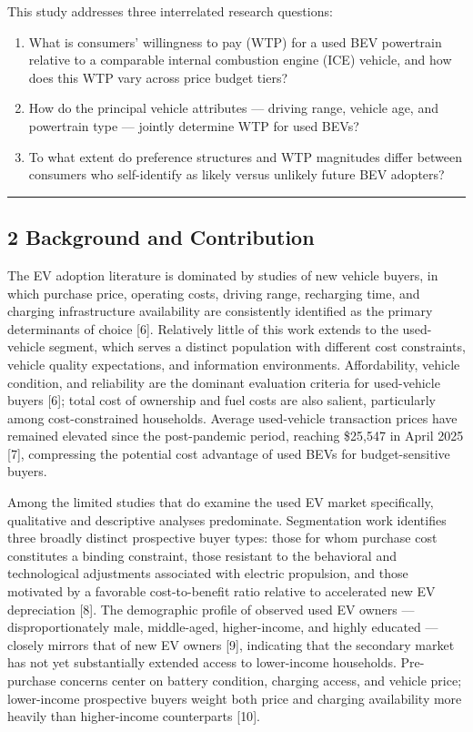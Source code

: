 \documentclass[
  letterpaper,
  DIV=11,
  numbers=noendperiod]{scrartcl}
\providecommand{\tightlist}{%
  \setlength{\itemsep}{0pt}\setlength{\parskip}{0pt}}\usepackage{longtable,booktabs,array}
\begin{document}
This study addresses three interrelated research questions:

\begin{enumerate}
\def\labelenumi{\arabic{enumi}.}
\tightlist
\item
  What is consumers' willingness to pay (WTP) for a used BEV powertrain
  relative to a comparable internal combustion engine (ICE) vehicle, and
  how does this WTP vary across price budget tiers?
\item
  How do the principal vehicle attributes --- driving range, vehicle
  age, and powertrain type --- jointly determine WTP for used BEVs?
\item
  To what extent do preference structures and WTP magnitudes differ
  between consumers who self-identify as likely versus unlikely future
  BEV adopters?
\end{enumerate}

\begin{center}\rule{0.5\linewidth}{0.5pt}\end{center}

\subsection{2 Background and
Contribution}\label{background-and-contribution}

The EV adoption literature is dominated by studies of new vehicle
buyers, in which purchase price, operating costs, driving range,
recharging time, and charging infrastructure availability are
consistently identified as the primary determinants of choice {[}6{]}.
Relatively little of this work extends to the used-vehicle segment,
which serves a distinct population with different cost constraints,
vehicle quality expectations, and information environments.
Affordability, vehicle condition, and reliability are the dominant
evaluation criteria for used-vehicle buyers {[}6{]}; total cost of
ownership and fuel costs are also salient, particularly among
cost-constrained households. Average used-vehicle transaction prices
have remained elevated since the post-pandemic period, reaching \$25,547
in April 2025 {[}7{]}, compressing the potential cost advantage of used
BEVs for budget-sensitive buyers.

Among the limited studies that do examine the used EV market
specifically, qualitative and descriptive analyses predominate.
Segmentation work identifies three broadly distinct prospective buyer
types: those for whom purchase cost constitutes a binding constraint,
those resistant to the behavioral and technological adjustments
associated with electric propulsion, and those motivated by a favorable
cost-to-benefit ratio relative to accelerated new EV depreciation
{[}8{]}. The demographic profile of observed used EV owners ---
disproportionately male, middle-aged, higher-income, and highly educated
--- closely mirrors that of new EV owners {[}9{]}, indicating that the
secondary market has not yet substantially extended access to
lower-income households. Pre-purchase concerns center on battery
condition, charging access, and vehicle price; lower-income prospective
buyers weight both price and charging availability more heavily than
higher-income counterparts {[}10{]}.
\end{document}

